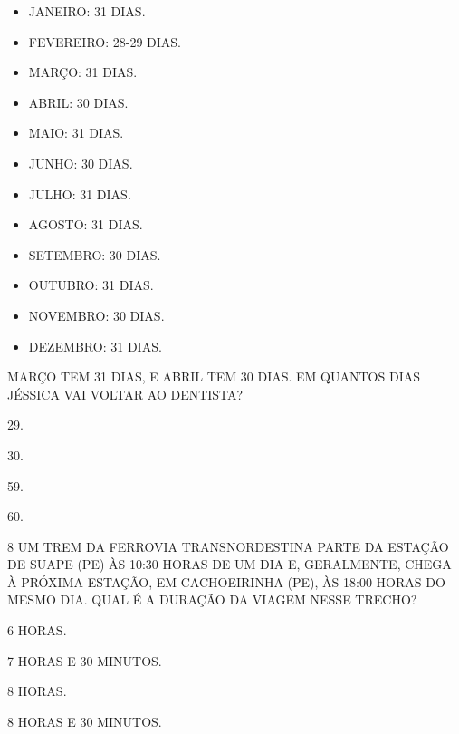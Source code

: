 \begin{myquote}
\begin{multicols}{2}
\begin{itemize}[itemsep=12pt]
  \item JANEIRO: 31 DIAS.
  \item FEVEREIRO: 28-29 DIAS.
  \item MARÇO: 31 DIAS.
  \item ABRIL: 30 DIAS.
  \item MAIO: 31 DIAS.
  \item JUNHO: 30 DIAS.
\columnbreak
  \item JULHO: 31 DIAS.
  \item AGOSTO: 31 DIAS.
  \item SETEMBRO: 30 DIAS.
  \item OUTUBRO: 31 DIAS.
  \item NOVEMBRO: 30 DIAS.
  \item DEZEMBRO: 31 DIAS.
\end{itemize}
\end{multicols}
\end{myquote}

MARÇO TEM 31 DIAS, E ABRIL TEM 30 DIAS. EM QUANTOS DIAS JÉSSICA VAI VOLTAR AO DENTISTA?

\begin{multicols}{2}
\begin{escolha}
\item 29.

\item 30.

\item 59.

\item 60.
\end{escolha}
\end{multicols}

\num{8} UM TREM DA FERROVIA TRANSNORDESTINA PARTE DA ESTAÇÃO DE SUAPE (PE) ÀS 10:30 
HORAS DE UM DIA E, GERALMENTE, CHEGA À PRÓXIMA ESTAÇÃO, EM CACHOEIRINHA (PE), ÀS 
18:00 HORAS DO MESMO DIA. QUAL É A DURAÇÃO DA VIAGEM NESSE TRECHO?

\begin{multicols}{2}
\begin{escolha}
\item 6 HORAS.

\item 7 HORAS E 30 MINUTOS.

\item 8 HORAS.

\item 8 HORAS E 30 MINUTOS.
\end{escolha}
\end{multicols}

